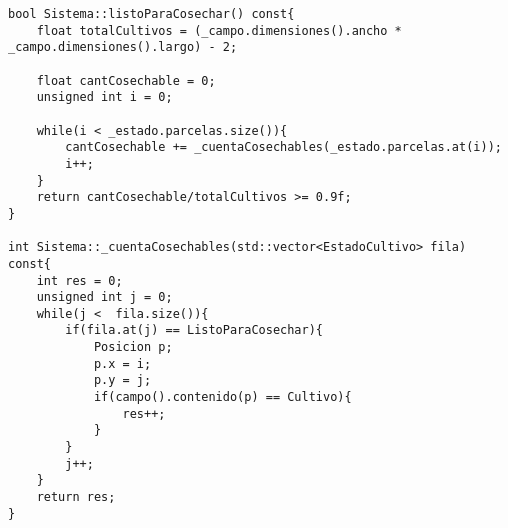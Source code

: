 \begin{lstlisting}
bool Sistema::listoParaCosechar() const{
    float totalCultivos = (_campo.dimensiones().ancho * _campo.dimensiones().largo) - 2;

    float cantCosechable = 0;
    unsigned int i = 0;

	while(i < _estado.parcelas.size()){
        cantCosechable += _cuentaCosechables(_estado.parcelas.at(i));
		i++;
    }
    return cantCosechable/totalCultivos >= 0.9f;
}

int Sistema::_cuentaCosechables(std::vector<EstadoCultivo> fila) const{
    int res = 0;
    unsigned int j = 0;
    while(j <  fila.size()){
        if(fila.at(j) == ListoParaCosechar){
            Posicion p;
            p.x = i;
            p.y = j;
            if(campo().contenido(p) == Cultivo){
                res++;
            }
        }
        j++;
    }
    return res;
}


\end{lstlisting}